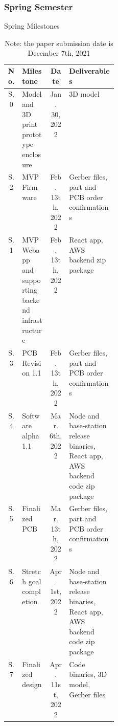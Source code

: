 \subsubsection{Spring Semester}
\begin{table}[H]
    \footnotesize  
    \caption{Spring Milestones}

    \begin{tabularx}{\linewidth}{| c | p{0.25\linewidth} | c | X |}
      \hline
      No. & Milestone & Date & Deliverables 
      \\\hline\hline

      S.0 
      & Model and 3D print prototype enclosure
      & Jan. 30, 2022
      & 3D model
      \\\hline

      S.2 
      & MVP Firmware
      & Feb. 13th, 2022 
      & Gerber files, part and PCB order confirmations
      \\\hline

      S.1 
      & MVP Webapp and supporting backend infrastructure
      & Feb. 13th, 2022 
      & React app, AWS backend zip package
      \\\hline

      S.3 
      & PCB Revision 1.1
      & Feb. 13th, 2022 
      & Gerber files, part and PCB order confirmations
      \\\hline

      S.4 
      & Software alpha 1.1 
      & Mar. 6th, 2022 
      & Node and base-station release binaries, React app, AWS backend code zip package 
      \\\hline

      S.5
      & Finalized PCB
      & Mar. 13th, 2022 
      & Gerber files, part and PCB order confirmations
      \\\hline

      S.6 
      & Stretch goal completion
      & Apr. 1st, 2022
      & Node and base-station release binaries, React app, AWS backend code zip package 
      \\\hline

      S.7 
      & Finalized design
      & Apr. 11st, 2022
      & Code binaries, 3D model, Gerber files
      \\\hline

    \end{tabularx}
    \caption*{\footnotesize Note: the paper submission date is December 7th, 2021}
    \label{tab:spring-milestones}
\end{table}

